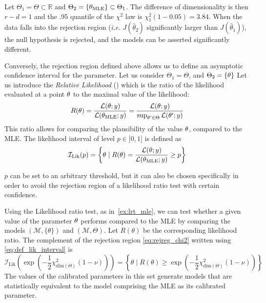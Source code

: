 \documentclass[../../Main_ManuscritThese.tex]{subfiles}
\begin{document}
\begin{example}
  \label{ex:lrt_mle}
  Let $\Theta_1 = \Theta\subset \mathbb{R}$ and $\Theta_2 = \{{\theta}_{\mathrm{MLE}}\}\subset \Theta_1$.
 The difference of dimensionality is then $r-d=1$ and the .95 quantile of the $\chi^2$ law is $\chi^2_1(1-0.05) =3.84$. When the data falls into the rejection region (\emph{i.e.} $J(\hat{\theta}_2)$ significantly larger than $J(\hat{\theta}_1)$), the null hypothesis is rejected, and the models can be asserted significantly different. 
\end{example}



\label{sec:relative_likelihood}
Conversely, the rejection region defined above allows us to define an asymptotic confidence interval for the parameter. Let us consider $\Theta_1 = \Theta$, and $\Theta_2 = \{\theta\}$
Let us introduce the \emph{Relative Likelihood} (\cite{kalbfleisch_probability_1985}) which is the ratio of the likelihood evaluated at a point $\theta$ to the maximal value of the likelihood:
\begin{equation}
  R(\theta) = \frac{\mathcal{L}(\theta;y)}{\mathcal{L}({\theta}_{\mathrm{MLE}};y)} = \frac{\mathcal{L}(\theta;y)}{\sup_{\theta^{\prime} \in \Theta}\mathcal{L}(\theta^{\prime};y)}
\end{equation}
This ratio allows for comparing the plausibility of the value $\theta$, compared to the MLE.
The likelihood interval of level $p\in ]0,1]$ is defined as
\begin{equation}
  \label{eq:def_lik_interval}
  \mathcal{I}_{\mathrm{Lik}}(p) = \left\{\theta \mid R(\theta)=\frac{\mathcal{L}(\theta;y)}{\mathcal{L}({\theta}_{\mathrm{MLE}};y)} \geq p\right\}
\end{equation}

$p$ can be set to an arbitrary threshold, but it can also be chosen specifically in order to avoid the rejection region of a likelihood ratio test with certain confidence.

Using the Likelihood ratio test, as in~\cref{ex:lrt_mle}, we can test whether a given value of the parameter $\theta$ performs compared to the MLE by comparing the models $(\mathcal{M}, \{\theta\})$ and $(\mathcal{M},\Theta)$. Let $R(\theta)$ be the corresponding likelihood ratio. The complement of the rejection region \cref{eq:rejreg_chi2} written using \cref{eq:def_lik_interval} is
\begin{equation}
  \label{eq:rel_lik_threshold}
  \mathcal{I}_{\mathrm{Lik}}\left(\exp\left(-\frac{1}{2}\chi^2_{\mathrm{dim}(\Theta)}(1-\nu)\right)\right) = \left\{\theta \mid R(\theta) \geq \exp\left(-\frac{1}{2}\chi^2_{\mathrm{dim}(\Theta)}(1-\nu)\right) \right\}
\end{equation}
The values of the calibrated parameters in this set generate models that are statistically equivalent to the model comprising the MLE as its calibrated parameter.
\end{document}
